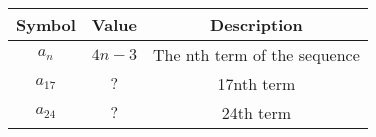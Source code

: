 
    \begin{tabular}{|c|c|c|}
    \hline
     \textbf{Symbol} & \textbf{Value} &
     \textbf{Description}\\
    \hline
     $a_n$ &  $4n-3$ & The nth term of the sequence\\[6pt]
    \hline 
     $a_{17}$ &  $?$ & 17nth term \\[6pt]
    \hline
     $a_{24}$ &  $?$ & 24th term\\[6pt]
    \hline
     
\end{tabular}
